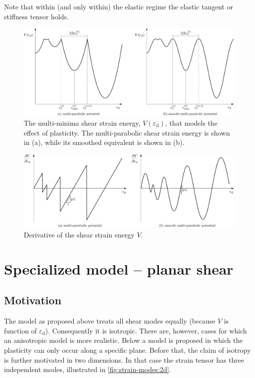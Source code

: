 \documentclass[fleqn]{goose-article}
\begin{document}
Note that within (and only within) the elastic regime the
elastic tangent or stiffness tensor holds.

\begin{figure}[htp]
    \centering
    \includegraphics[width=1.\textwidth]{figures/potential_V-plas}
    \caption{
        The multi-minima shear strain energy, $V ( \varepsilon_\mathrm{d} )$,
        that models the effect of plasticity.
    The multi-parabolic shear strain energy is shown in (a),
    while its smoothed equivalent is shown in (b).}
    \label{fig:V:plas}
\end{figure}

\begin{figure}[htp]
    \centering
    \includegraphics[width=1.\textwidth]{figures/potential_dV-plas}
    \caption{Derivative of the shear strain energy $V$.}
    \label{fig:dV:plas}
\end{figure}

\section{Specialized model -- planar shear}

\subsection{Motivation}

The model as proposed above treats all shear modes equally
(because $V$ is function of $\varepsilon_\mathrm{d}$).
Consequently it is isotropic.
There are, however, cases for which an anisotropic model is more realistic.
Below a model is proposed in which the plasticity can only occur along a specific plane.
Before that, the claim of isotropy is further motivated in two dimensions.
In that case the strain tensor has three independent modes,
illustrated in \cref{fig:strain-modes:2d}.
\end{document}
